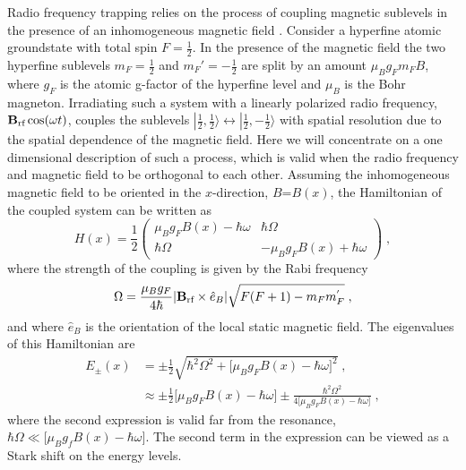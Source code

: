 Radio frequency trapping relies on the process of coupling magnetic
sublevels in the presence of an inhomogeneous magnetic field
\cite{Zobay:01,Courteille:06,Hofferberth:07,Schumm:05}. Consider a
hyperfine atomic groundstate with total spin $F=\frac{1}{2}$. In the
presence of the magnetic field the two hyperfine sublevels
$m_F=\frac{1}{2}$ and $m_F'=-\frac{1}{2}$ are split by an amount
$\mu_B g_F m_F B$, where $g_F$ is the atomic g-factor of the hyperfine
level and $\mu_B$ is the Bohr magneton. Irradiating such a system with
a linearly polarized radio frequency, ${\bf B}_\text{rf} \cos(\omega
t)$, couples the sublevels $|\frac{1}{2},\frac{1}{2}\rangle
\leftrightarrow |\frac{1}{2},-\frac{1}{2}\rangle$ with spatial
resolution due to the spatial dependence of the magnetic field. Here
we will concentrate on a one dimensional description of such a
process, which is valid when the radio frequency and magnetic field to
be orthogonal to each other.  Assuming the inhomogeneous magnetic
field to be oriented in the $x$-direction, $B$=$B(x)$, the Hamiltonian
of the coupled system can be written as
\begin{equation}
  \label{eq:rfHamiltonian}
  H(x)=\frac{1}{2}
    \left(\begin{array}{cccc}
    \mu_B g_F B(x) - \hbar \omega & 
    \hbar \Omega  \\
    \hbar \Omega & 
    -\mu_B g_F B(x) + \hbar \omega  
          \end{array}\right) \;,
\end{equation}
where the strength of the coupling is given by the Rabi frequency
\cite{Ketterle:96}
\begin{equation}
  \label{eq:Rabi Frequency}
  \Omega=\frac{\mu_B g_F}{4\hbar}| {\bf B}_\text{rf} \times 
         \hat{e}_B | \sqrt{F(F+1) - m_F m^{'}_F}\;,
\end{equation}
and where $\hat{e}_B$ is the orientation of the local static magnetic
field. The eigenvalues of this Hamiltonian are \cite{Courteille:06}
\begin{align}
  E_{\pm}(x) &= \pm \frac{1}{2} \sqrt{ \hbar^2 \Omega^2 
              + \lbrack \mu_B g_F B(x) - \hbar \omega \rbrack^2}\;,\\
            &\approx \pm \frac{1}{2} \lbrack \mu_B g_F B(x) 
                   - \hbar \omega \rbrack 
                   \pm \frac{\hbar^2 \Omega^2}
                   {4 \lbrack \mu_B g_F B(x) - \hbar \omega \rbrack}\;,
\end{align}
where the second expression is valid far from the resonance, $\hbar
\Omega \ll \lbrack \mu_B g_f B(x) - \hbar \omega \rbrack$. The second 
term in the expression can be viewed as a Stark shift on the energy levels.

